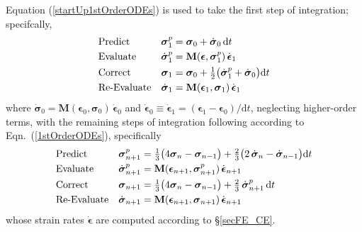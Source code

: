 Equation (\ref{startUp1stOrderODEs}) is used to take the first step of integration; specifcally, 
\begin{subequations}
    \notag
    \begin{align}
    \mbox{} & \text{Predict} & 
    \boldsymbol{\sigma}_1^p & = \boldsymbol{\sigma}_0 + \dot{\boldsymbol{\sigma}}_0 \, \mathrm{d}t \\
    \mbox{} & \text{Evaluate} & 
    \dot{\boldsymbol{\sigma}}^p_1 & = \mathbf{M} ( \boldsymbol{\epsilon} , \boldsymbol{\sigma}_1^p ) \, \dot{\boldsymbol{\epsilon}}_1 \\
    \mbox{} & \text{Correct} &
    \boldsymbol{\sigma}_1 & = \boldsymbol{\sigma}_0 + \tfrac{1}{2} 
    \bigl( \dot{\boldsymbol{\sigma}}_1^p + 
    \dot{\boldsymbol{\sigma}}_0 \bigr) \mathrm{d} t \\
    \mbox{} & \text{Re-Evaluate} & 
    \dot{\boldsymbol{\sigma}}_1 & = \mathbf{M} ( \boldsymbol{\epsilon}_1 , \boldsymbol{\sigma}_1 ) \, \dot{\boldsymbol{\epsilon}}_1
    \end{align}
\end{subequations}
where $\dot{\boldsymbol{\sigma}}_0 = \mathbf{M} ( \boldsymbol{\epsilon}_0 , \boldsymbol{\sigma}_0 ) \, \dot{\boldsymbol{\epsilon}}_0$ and $\dot{\boldsymbol{\epsilon}}_0 \equiv \dot{\boldsymbol{\epsilon}}_1 = ( \boldsymbol{\epsilon}_1 - \boldsymbol{\epsilon}_0 ) / \mathrm{d} t$, neglecting higher-order terms, with the remaining steps of integration following according to Eqn.~(\ref{1stOrderODEs}), specifically
\begin{subequations}
    \notag
    \begin{align}
    \mbox{} & \text{Predict} & 
    \boldsymbol{\sigma}_{n+1}^p & = \tfrac{1}{3} 
    \bigl( 4 \boldsymbol{\sigma}_n - \boldsymbol{\sigma}_{n-1} \bigr) + 
    \tfrac{2}{3} \bigl( 2 \, \dot{\boldsymbol{\sigma}}_n - 
    \dot{\boldsymbol{\sigma}}_{n-1} \bigr) \mathrm{d} t \\
    \mbox{} & \text{Evaluate} & 
    \dot{\boldsymbol{\sigma}}^p_{n+1} & = \mathbf{M} ( \boldsymbol{\epsilon}_{n+1} , \boldsymbol{\sigma}_{n+1}^p ) \, \dot{\boldsymbol{\epsilon}}_{n+1} \\
    \mbox{} & \text{Correct} &
    \boldsymbol{\sigma}_{n+1} & = \tfrac{1}{3} 
    \bigl( 4 \boldsymbol{\sigma}_n - \boldsymbol{\sigma}_{n-1} \bigr) + 
    \tfrac{2}{3} \, \dot{\boldsymbol{\sigma}}^{p}_{n+1} \, \mathrm{d}t \\
    \mbox{} & \text{Re-Evaluate} & 
    \dot{\boldsymbol{\sigma}}_{n+1} & = \mathbf{M} ( \boldsymbol{\epsilon}_{n+1} , 
    \boldsymbol{\sigma}_{n+1} ) \, \dot{\boldsymbol{\epsilon}}_{n+1}
    \end{align}
\end{subequations} 
whose strain rates $\dot{\boldsymbol{\epsilon}}$ are computed according to \S\ref{secFE_CE}.


